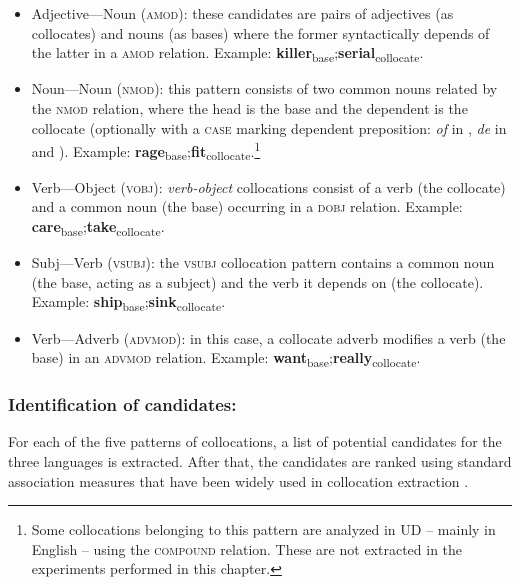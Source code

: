 \documentclass[output=paper
,modfonts
,nonflat]{langsci/langscibook}
\begin{document}
\begin{itemize}
\item Adjective---Noun (\textsc{amod}): these candidates are pairs of adjectives
(as collocates) and nouns (as bases) where the former syntactically depends
of the latter in a \textsc{amod} relation.
Example: \textbf{killer}\textsubscript{base};\textbf{serial}\textsubscript{collocate}.

\item Noun---Noun (\textsc{nmod}): this pattern consists of two common
nouns related by the \textsc{nmod} relation, where the head is the base
and the dependent is the collocate (optionally with a \textsc{case} marking
dependent preposition: \emph{of} in , \emph{de} in  and ).
Example: \textbf{rage}\textsubscript{base};\textbf{fit}\textsubscript{collocate}.\footnote{Some
  collocations belonging to this pattern are analyzed in UD -- mainly in English --
  using the \textsc{compound} relation. These are not extracted in the experiments performed in this chapter.}

\item Verb---Object (\textsc{vobj}): \emph{verb-object} collocations consist
of a verb (the collocate) and a common noun (the base)
occurring in a \textsc{dobj} relation.
Example: \textbf{care}\textsubscript{base};\textbf{take}\textsubscript{collocate}.

\item Subj---Verb (\textsc{vsubj}): the \textsc{vsubj} collocation pattern contains a
  common noun (the base, acting as a subject) and the verb it depends on
  (the collocate).
  Example: \textbf{ship}\textsubscript{base};\textbf{sink}\textsubscript{collocate}.
  
\item Verb---Adverb (\textsc{advmod}): in this case, a collocate adverb modifies
  a verb (the base) in an \textsc{advmod} relation.
  Example: \textbf{want}\textsubscript{base};\textbf{really}\textsubscript{collocate}.
\end{itemize}

\subsubsection{Identification of candidates:} For each of the five patterns of
collocations, a list of potential candidates for the three languages is extracted.
After that, the candidates are ranked using standard association measures that have
been widely used in collocation extraction \citep{evert2008}.
\end{document}
